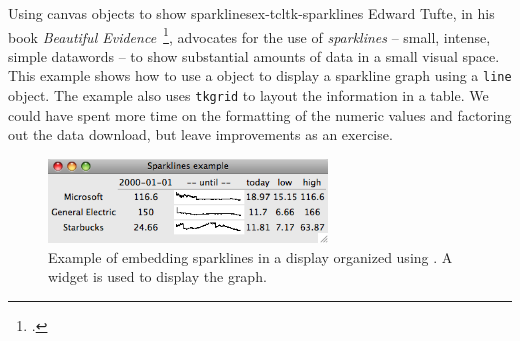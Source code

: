 \begin{example}{Using canvas objects to show sparklines}{ex-tcltk-sparklines}
Edward Tufte, in his book \textit{Beautiful
  Evidence}~\footcite{Tufte:Beautiful-Evidence}, advocates for the use of
\textit{sparklines} -- small, intense, simple datawords -- to show substantial
amounts of data in a small visual space. This example shows how to use
a  object to display a sparkline graph using a \texttt{line} object. The example also uses \texttt{tkgrid}
to layout the information in a  table. We could have spent more time on the
formatting of the numeric values and factoring out the data download, but leave improvements as an exercise.


\begin{figure}
  \centering
  \includegraphics[width=0.66\textwidth]{fig-tcltk-sparklines.png}
  \caption{Example of embedding sparklines in a display organized
    using . A  widget is used to display
    the graph.}
  \label{fig:fig-tcltk-sparklines}
\end{figure}



\end{example}

